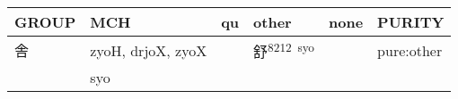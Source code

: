 \documentclass[14pt,a4paper]{scrartcl}
\begin{document}
\begin{longtable}[c]{@{}llllll@{}}
\toprule
\begin{minipage}[b]{0.14\columnwidth}\raggedright\strut
GROUP
\strut\end{minipage} &
\begin{minipage}[b]{0.14\columnwidth}\raggedright\strut
MCH
\strut\end{minipage} &
\begin{minipage}[b]{0.14\columnwidth}\raggedright\strut
qu
\strut\end{minipage} &
\begin{minipage}[b]{0.14\columnwidth}\raggedright\strut
other
\strut\end{minipage} &
\begin{minipage}[b]{0.14\columnwidth}\raggedright\strut
none
\strut\end{minipage} &
\begin{minipage}[b]{0.14\columnwidth}\raggedright\strut
PURITY
\strut\end{minipage}\tabularnewline
\midrule
\endhead
\begin{minipage}[t]{0.14\columnwidth}\raggedright\strut
舎
\strut\end{minipage} &
\begin{minipage}[t]{0.14\columnwidth}\raggedright\strut
zyoH, drjoX, zyoX
\strut\end{minipage} &
\begin{minipage}[t]{0.14\columnwidth}\raggedright\strut
\strut\end{minipage} &
\begin{minipage}[t]{0.14\columnwidth}\raggedright\strut
舒\textsuperscript{8212~syo}
\strut\end{minipage} &
\begin{minipage}[t]{0.14\columnwidth}\raggedright\strut
\strut\end{minipage} &
\begin{minipage}[t]{0.14\columnwidth}\raggedright\strut
pure:other
\strut\end{minipage}\tabularnewline
\begin{minipage}[t]{0.14\columnwidth}\raggedright\strut
𡐨
\strut\end{minipage} &
\begin{minipage}[t]{0.14\columnwidth}\raggedright\strut
syo
\strut\end{minipage} &
\begin{minipage}[t]{0.14\columnwidth}\raggedright\strut
\strut\end{minipage} &

\end{longtable}
\end{document}
